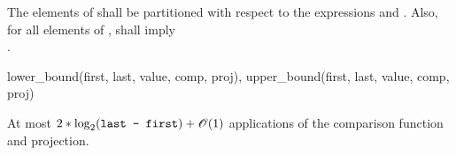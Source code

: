 \begin{itemdescr}
\pnum
\requires
The elements
of
shall be partitioned with respect to the expressions
and
.
Also, for all elements
of
\tcode{[first, last)},
shall imply \\
.

\pnum
\returns
\begin{codeblock}
{lower_bound(first, last, value, comp, proj),
 upper_bound(first, last, value, comp, proj)}
\end{codeblock}

\pnum
\complexity
At most
$2 * \log_2(\texttt{last - first}) + \mathscr{O}(1)$
applications of the comparison function and projection.
\end{itemdescr}
